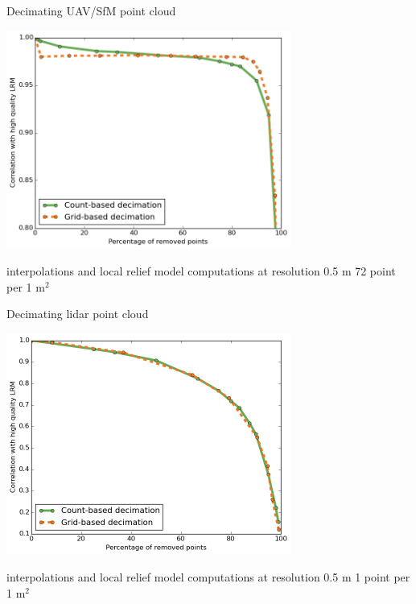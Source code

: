 \documentclass[xcolor={dvipsnames,usenames},beamer,aspectratio=43]{beamer}
\begin{document}
\begin{frame}{Decimating UAV/SfM point cloud}

\begin{center}

\includegraphics[width=0.7\textwidth]{decimation/lrm_grid_count_uav}

\end{center}

interpolations and
local relief model computations at resolution 0.5 m
72 point per 1 m$^2$

\end{frame}


\begin{frame}{Decimating lidar point cloud}

\begin{center}
\includegraphics[width=0.7\textwidth]{decimation/lrm_grid_count_lidar}

\end{center}

interpolations and
local relief model computations at resolution 0.5 m
1 point per 1 m$^2$

\end{frame}
\end{document}
